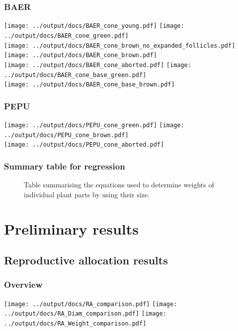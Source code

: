 \documentclass[10pt]{book} %
\begin{document}
\subsection{BAER}
\begin{center}
\texttt{[image: ../output/docs/BAER\_cone\_young.pdf]}
\texttt{[image: ../output/docs/BAER\_cone\_green.pdf]}\\
\texttt{[image: ../output/docs/BAER\_cone\_brown\_no\_expanded\_follicles.pdf]}
\texttt{[image: ../output/docs/BAER\_cone\_brown.pdf]}\\
\texttt{[image: ../output/docs/BAER\_cone\_aborted.pdf]}
\texttt{[image: ../output/docs/BAER\_cone\_base\_green.pdf]}\\
\texttt{[image: ../output/docs/BAER\_cone\_base\_brown.pdf]}
\end{center}

\subsection{PEPU}
\begin{center}
\texttt{[image: ../output/docs/PEPU\_cone\_green.pdf]}
\texttt{[image: ../output/docs/PEPU\_cone\_brown.pdf]}\\
\texttt{[image: ../output/docs/PEPU\_cone\_aborted.pdf]}
\end{center}
\newpage
\subsection{Summary table for regression}
\begin{figure}[h!]
\begin{center}

\end{center}
\caption{Table summarising the equations used to determine weights of individual plant parts by using their size.}
\end{figure}

\chapter{Preliminary results}
\section{Reproductive allocation results}
\subsection{Overview}
\texttt{[image: ../output/docs/RA\_comparison.pdf]}
\texttt{[image: ../output/docs/RA\_Diam\_comparison.pdf]}
\texttt{[image: ../output/docs/RA\_Weight\_comparison.pdf]}
\clearpage
\newpage
\end{document}
